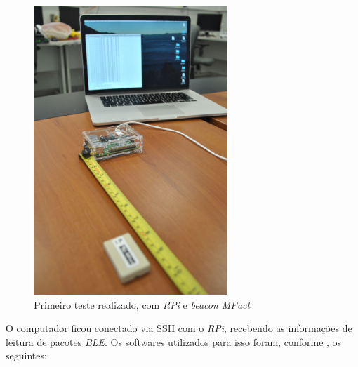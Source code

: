 \documentclass[
		12pt,				%
		openright,			%
		oneside,			%
		a4paper,			%
		chapter=TITLE,		%
		english,			%
		brazil				%
	]{abntex2}
\begin{document}
\begin{figure}[htb]
	\caption{\label{fig:inicio-ambiente}Primeiro teste realizado, com \textit{RPi} e \textit{beacon MPact}}
	\begin{center}
		\includegraphics[width=0.65\textwidth]{img/ambiente1.jpg}
	\end{center}
\end{figure}

O computador ficou conectado via SSH com o \textit{RPi}, recebendo as informações de leitura de pacotes \textit{BLE}. Os softwares utilizados para isso foram, conforme , os seguintes:
\end{document}
